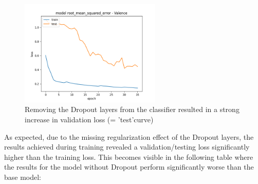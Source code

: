 \begin{figure}[H]
  \begin{center}
  \includegraphics[angle=0, width=0.6\textwidth]{Figures/rmse_out1_noDropout.png}
  \caption{Removing the Dropout layers from the classifier resulted in a strong increase in validation loss (= 'test'curve)}
  \label{fig:AblationNoDropout}
  \end{center}
\end{figure}

As expected, due to the missing regularization effect of the Dropout layers, the results achieved during training revealed a validation/testing loss significantly higher than the training loss. This becomes visible in the following table where the results for the model without Dropout perform significantly worse than the base model:

